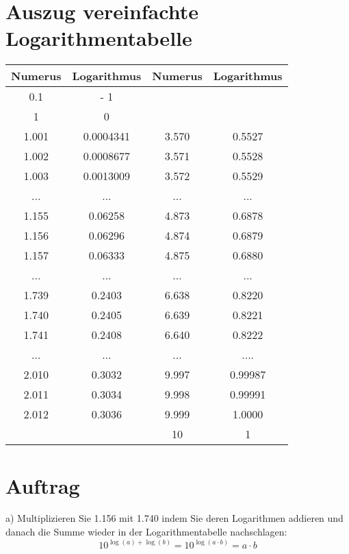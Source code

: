 




\renewcommand{\metaHeaderLine}{Logarithmen}
\renewcommand{\arbeitsblattTitel}{Multiplikation durch Addition}

\arbeitsblattHeader{}

\section*{Auszug vereinfachte Logarithmentabelle}

\begin{tabular}{|c|c|| c | c |}\hline
Numerus & Logarithmus & Numerus & Logarithmus\\\hline
0.1   & - 1        &   &  \\\hline
1     & 0          &   &  \\\hline
1.001 & 0.0004341  & 3.570 & 0.5527\\
1.002 & 0.0008677  & 3.571 & 0.5528\\
1.003 & 0.0013009  & 3.572 & 0.5529\\
...   & ...        & ...   & ... \\
1.155 & 0.06258    & 4.873 & 0.6878\\
1.156 & 0.06296    & 4.874 & 0.6879\\
1.157 & 0.06333    & 4.875 & 0.6880\\
...   & ...        & ...   & ...  \\
1.739 & 0.2403     & 6.638 & 0.8220\\
1.740 & 0.2405     & 6.639 & 0.8221\\
1.741 & 0.2408     & 6.640 & 0.8222\\
...   & ...        & ...   & ....\\
2.010 & 0.3032     & 9.997 & 0.99987\\
2.011 & 0.3034     & 9.998 & 0.99991\\
2.012 & 0.3036     & 9.999 & 1.0000\\\hline
      &            & 10    & 1\\\hline
\end{tabular}
 
\section*{Auftrag}
a) Multiplizieren Sie 1.156 mit 1.740 indem Sie deren Logarithmen
addieren und danach die Summe wieder in der Logarithmentabelle
nachschlagen:
$$10^{\log(a) + \log(b) } = 10^{\log(a\cdot{}b)} = a\cdot{}b$$

